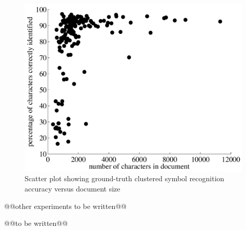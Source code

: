 \documentclass[times, 10pt,twocolumn]{article}
\begin{document}
\begin{figure}[ht]
  \centering
  \includegraphics[scale=.4]{figures/gt_character_accuracy}
  \caption{Scatter plot showing ground-truth clustered symbol recognition 
  accuracy versus document size}
  \label{gtcharacc_fig}
\end{figure}

@@other experiments to be written@@


@@to be written@@




\end{document}
